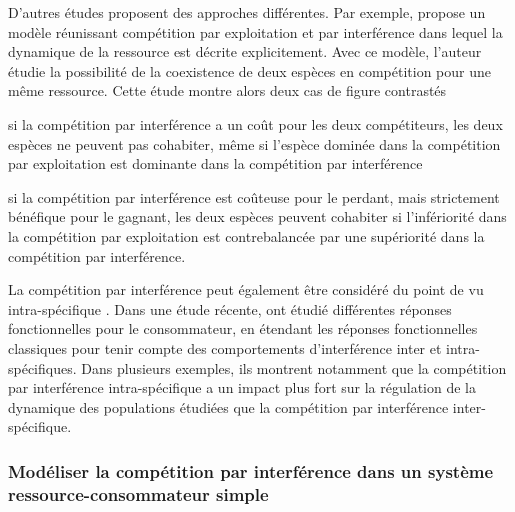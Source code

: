 D'autres études proposent des approches différentes. Par exemple,
\textcite{amarasekare2002a} propose un modèle réunissant compétition par
exploitation et par interférence dans lequel la dynamique de la ressource est
décrite explicitement. Avec ce modèle, l'auteur étudie la possibilité de la
coexistence de deux espèces en compétition pour une même ressource. Cette étude
montre alors deux cas de figure contrastés \begin{enumerate*}[label=(\roman*),
before=\unskip{ : }, itemjoin={{ ; }}, itemjoin*={{ ; et }}] \item si la
compétition par interférence a un coût pour les deux compétiteurs, les deux
espèces ne peuvent pas cohabiter, même si l'espèce dominée dans la compétition
par exploitation est dominante dans la compétition par interférence \item si la
compétition par interférence est coûteuse pour le perdant, mais strictement
bénéfique pour le gagnant, les deux espèces peuvent cohabiter si l'infériorité
dans la compétition par exploitation est contrebalancée par une supériorité dans
la compétition par interférence. \end{enumerate*}

La compétition par interférence peut également être considéré du point de vu
intra-spécifique \autocites{walde1984a, crowley1987a, maddonni2004a,
smallegange2006a}. Dans une étude récente, \textcite{de-villemereuil2011a} ont
étudié différentes réponses fonctionnelles pour le consommateur, en étendant les
réponses fonctionnelles classiques pour tenir compte des comportements
d'interférence inter et intra-spécifiques. Dans plusieurs exemples, ils montrent
notamment que la compétition par interférence intra-spécifique a un impact plus
fort sur la régulation de la dynamique des populations étudiées que la compétition par
interférence inter-spécifique. 

\subsubsection{Modéliser la compétition par interférence dans un système
ressource-consommateur simple}

